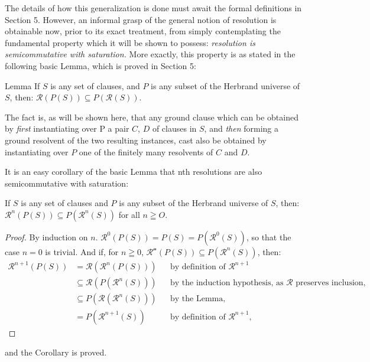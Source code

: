 \documentclass[8pt]{extarticle}
\begin{document}
The details of how this generalization is done must await the formal definitions in Section 5. However, an informal grasp of the general notion of resolution is obtainable now, prior to its exact treatment, from simply contemplating the fundamental property which it will be shown to possess: \emph{resolution is semicommutative with saturation.} More exactly, this property is as stated in the following basic Lemma, which is proved in Section 5:

\begin{p7lemma}{Lemma}\label{p7lemma}
If $S$ is any set of clauses, and $P$ is any subset of the Herbrand universe of $S$, then: $\mathscr{R}(P(S)) \subseteq P(\mathscr{R}(S))$.
\end{p7lemma}

The fact is, as will be shown here, that any ground clause which can be obtained by \emph{first} instantiating over P a pair $C$, $D$ of clauses in $S$, and \emph{then} forming a ground resolvent of the two resulting instances, cast also be obtained by instantiating over $P$ one of the finitely many resolvents of $C$ and $D$.

It is an easy corollary of the basic Lemma that nth resolutions are also semicommutative with saturation: 

\begin{p7corollary}{}\label{p7corollary}
If $S$ is any set of clauses and $P$ is any subset of the Herbrand
universe of $S$, then: $\mathscr{R}^n(P(S)) \subseteq P(\mathscr{R}^n(S))$ for all $n \geqq O$.
\end{p7corollary}

\begin{proof}
    By induction on $n$. $\mathscr{R}^0(P(S)) = P(S) = P(\mathscr{R}^0(S))$, so that the case $n = 0$ is trivial. And if, for $n \geqq 0$, $\mathscr{R^n}(P(S)) \subseteq P(\mathscr{R}^n(S))$, then:
    \begin{align*}
        \mathscr{R}^{n+1}(P(S)) &= \mathscr{R}(\mathscr{R}^n(P(S))) && \text{by definition of $\mathscr{R}^{n+1}$}\\
                                &\subseteq \mathscr{R}(P(\mathscr{R}^n(S))) && \text{by the induction hypothesis, as $\mathscr{R}$ preserves inclusion,}\\
                                &\subseteq P(\mathscr{R}(\mathscr{R}^n(S))) && \text{by the Lemma,}\\
                                &= P(\mathscr{R}^{n+1}(S)) && \text{by definition of $\mathscr{R}^{n+1}$,}
    \end{align*}
\end{proof}
\noindent and the Corollary is proved.
\newpage
\end{document}
